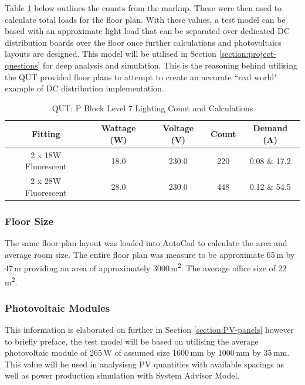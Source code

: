 Table \ref{table:QUTlvl7-count} below outlines the counts from the markup. These were then used to calculate total loads for the floor plan. With these values, a test model can be based with an approximate light load that can be separated over dedicated DC distribution boards over the floor once further calculations and photovoltaics layouts are designed. This model will be utilised in Section \ref{section:project-questions} for deep analysis and simulation. This is the reasoning behind utilising the QUT provided floor plans to attempt to create an accurate ``real world" example of DC distribution implementation.     

\begin{table}[!ht]
	\centering
	\renewcommand{\arraystretch}{2}
	\begin{tabular}{|c|c|c|c|c|}
		\hline
		\textbf{Fitting} & \textbf{Wattage (W)} & \textbf{Voltage (V)} & \textbf{Count} & \textbf{Demand (A)} \\ \hline
		2 x 18W Fluorescent & 18.0 & 230.0 & 220 &  0.08 \& 17.2 \\ \hline
		2 x 28W Fluorescent & 28.0 & 230.0 & 448 & 0.12 \& 54.5 \\ \hline
	\end{tabular}

	\caption{QUT: P Block Level 7 Lighting Count and Calculations}
	\label{table:QUTlvl7-count}
\end{table}

\subsubsection{Floor Size}

The same floor plan layout was loaded into AutoCad to calculate the area and average room size. The entire floor plan was measure to be approximate 65\,m by 47\,m providing an area of approximately 3000\,\si{m^2}. The average office size of 22\,\si{m^2}. 

\subsubsection{Photovoltaic Modules}

This information is elaborated on further in Section \ref{section:PV-panels} however to briefly preface, the test model will be based on utilising the average photovoltaic module of 265\,W of assumed size 1600\,mm by 1000\,mm by 35\,mm. This value will be used in analysisng PV quantities with available spacings as well as power production simulation with System Advisor Model. 

